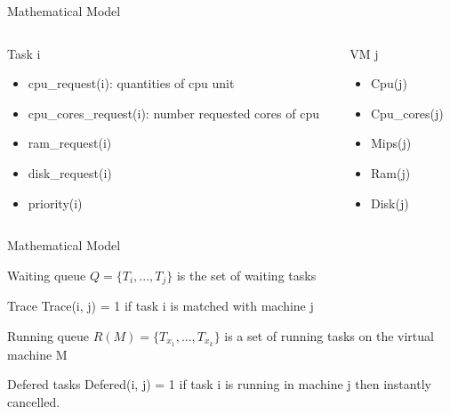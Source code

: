 \documentclass[10pt,xcolor={dvipsnames}, aspectratio=169]{beamer}
\begin{document}
\begin{frame}
{Mathematical Model}
	\begin{columns}[T] %
		\begin{column}{.48\textwidth}
			\begin{block}
				{Task i}
				\begin{itemize}
					\item cpu\_request(i): quantities of cpu unit
					\item cpu\_cores\_request(i): number requested cores of cpu
					\item ram\_request(i)
					\item disk\_request(i)
					\item priority(i)
				\end{itemize}
			\end{block}
	\end{column}%
	\hfill%
	\begin{column}{.48\textwidth}
		\begin{block}
		{VM j}
			\begin{itemize}
				\item Cpu(j)
				\item Cpu\_cores(j)
				\item Mips(j)
				\item Ram(j)
				\item Disk(j)
			\end{itemize}
		\end{block}
	\end{column}%
	\end{columns}
\end{frame}

\begin{frame}
	{Mathematical Model}
	\begin{block}
		{Waiting queue}
		$Q = \{T_{i}, ..., T_{j}\}$ is the set of waiting tasks
	\end{block}
	\begin{block}
		{Trace} 
		Trace(i, j) = 1 if task i is matched with machine j
	\end{block}
	\begin{block}
		{Running queue}
		$R(M) = \{T_{x_{1}}, ..., T_{x_{k}}\}$ is a set of running tasks on the virtual machine M
	\end{block}
	\begin{block}
		{Defered tasks} 
		Defered(i, j) = 1 if task i is running in machine j then instantly cancelled.
	\end{block}
\end{frame}
\end{document}
